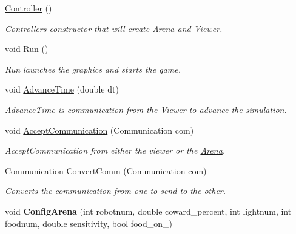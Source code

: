 \begin{DoxyCompactItemize}
\item 
\mbox{\label{class_controller_a95c56822d667e94b031451729ce069a9}} 
\mbox{\hyperlink{class_controller_a95c56822d667e94b031451729ce069a9}{Controller}} ()
\begin{DoxyCompactList}\small\item\em \mbox{\hyperlink{class_controller}{Controller}}\textquotesingle{}s constructor that will create \mbox{\hyperlink{class_arena}{Arena}} and Viewer. \end{DoxyCompactList}\item 
\mbox{\label{class_controller_a17abb2cec6c0109e9b2df3cdc082eaad}} 
void \mbox{\hyperlink{class_controller_a17abb2cec6c0109e9b2df3cdc082eaad}{Run}} ()
\begin{DoxyCompactList}\small\item\em Run launches the graphics and starts the game. \end{DoxyCompactList}\item 
\mbox{\label{class_controller_a6a4a3eaee03f6c4718da3f8293d7e053}} 
void \mbox{\hyperlink{class_controller_a6a4a3eaee03f6c4718da3f8293d7e053}{Advance\+Time}} (double dt)
\begin{DoxyCompactList}\small\item\em Advance\+Time is communication from the Viewer to advance the simulation. \end{DoxyCompactList}\item 
\mbox{\label{class_controller_a55b8d46984535adb91f40309914e8852}} 
void \mbox{\hyperlink{class_controller_a55b8d46984535adb91f40309914e8852}{Accept\+Communication}} (Communication com)
\begin{DoxyCompactList}\small\item\em Accept\+Communication from either the viewer or the \mbox{\hyperlink{class_arena}{Arena}}. \end{DoxyCompactList}\item 
Communication \mbox{\hyperlink{class_controller_ae9b0504ab74cdacc654528b609074adc}{Convert\+Comm}} (Communication com)
\begin{DoxyCompactList}\small\item\em Converts the communication from one to send to the other. \end{DoxyCompactList}\item 
\mbox{\label{class_controller_ad1d08bc573c4e2b454134b08a448aea1}} 
void {\bfseries Config\+Arena} (int robotnum, double coward\+\_\+percent, int lightnum, int foodnum, double sensitivity, bool food\+\_\+on\+\_\+)
\end{DoxyCompactItemize}


